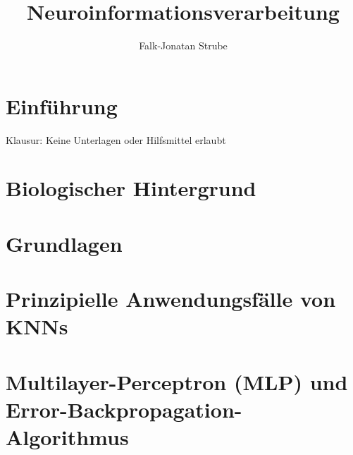 \documentclass{scrreprt}
\title{Neuroinformations\-verarbeitung}
\author{Falk-Jonatan Strube}
\begin{document}
\maketitle
\tableofcontents

\chapter*{Einführung}
Klausur: Keine Unterlagen oder Hilfsmittel erlaubt

\chapter{Biologischer Hintergrund}


\chapter{Grundlagen}


\chapter{Prinzipielle Anwendungsfälle von KNNs}




\chapter{Multilayer-Perceptron (MLP) und Error-Backpropagation-Algorithmus}

\end{document}
